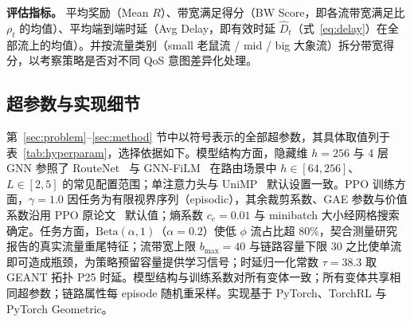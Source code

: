 \textbf{评估指标。} 平均奖励（Mean $R$）、带宽满足得分（BW Score，即各流带宽满足比 $\rho_t$ 的均值）、平均端到端时延（Avg Delay，即有效时延 $\hat D_t$（式~\eqref{eq:delay}）在全部流上的均值）。并按流量类别（small 老鼠流 / mid / big 大象流）拆分带宽得分，以考察策略是否对不同 QoS 意图差异化处理。

\subsection{超参数与实现细节}
\label{sec:exp:hyperparam}

第~\ref{sec:problem}--\ref{sec:method} 节中以符号表示的全部超参数，其具体取值列于表~\ref{tab:hyperparam}，选择依据如下。模型结构方面，隐藏维 $h=256$ 与 4 层 GNN 参照了 RouteNet~\cite{Rusek2020_JSAC_RouteNet} 与 GNN-FiLM~\cite{Brockschmidt2020_GNNFiLM} 在路由场景中 $h\in[64,256]$、$L\in[2,5]$ 的常见配置范围；单注意力头与 UniMP~\cite{Shi2021_UniMP} 默认设置一致。PPO 训练方面，$\gamma=1.0$ 因任务为有限视界序列（episodic），其余裁剪系数、GAE 参数与价值系数沿用 PPO 原论文~\cite{Schulman2017_PPO,Schulman2016_GAE} 默认值；熵系数 $c_e=0.01$ 与 minibatch 大小经网格搜索确定。任务方面，$\text{Beta}(\alpha, 1)$（$\alpha=0.2$）使低 $\phi$ 流占比超 80\%，契合测量研究~\cite{CISCO2023_GlobalTraffic} 报告的真实流量重尾特征；流带宽上限 $b_{\text{max}}=40$ 与链路容量下限 $30$ 之比使单流即可造成瓶颈，为策略预留容量提供学习信号；时延归一化常数 $\tau=38.3$ 取 GEANT 拓扑 P25 时延。模型结构与训练系数对所有变体一致；所有变体共享相同超参数；链路属性每 episode 随机重采样。实现基于 PyTorch、TorchRL 与 PyTorch Geometric。

